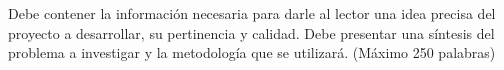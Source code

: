 \documentclass[../Main.tex]{subfiles}
\begin{document}
Debe contener la información necesaria para darle al lector una idea precisa del proyecto a
desarrollar, su pertinencia y calidad. Debe presentar una síntesis del problema a investigar y la
metodología que se utilizará. (Máximo 250 palabras)
\end{document}
